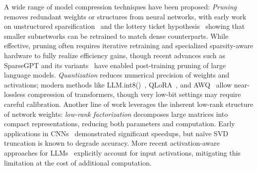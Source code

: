 \documentclass[10pt]{article} %
\theoremstyle{definition}
\theoremstyle{remark}
\begin{document}
A wide range of model compression techniques have been proposed:
\emph{Pruning} removes redundant weights or structures from neural networks, with early work on unstructured sparsification~\citep{han2015learning} and the lottery ticket hypothesis~\citep{frankle2019lottery} showing that smaller subnetworks can be retrained to match dense counterparts.
While effective, pruning often requires iterative retraining and specialized sparsity-aware hardware to fully realize efficiency gains, though recent advances such as SparseGPT and its variants~\citep{frantar2023sparsegpt,ma2023llm, ashkboos2024slicegpt, an2024fluctuation} have enabled post-training pruning of large language models.
\emph{Quantization} reduces numerical precision of weights and activations; modern methods like LLM.int8()~\citep{dettmers2022llmint8}, QLoRA~\citep{dettmers2023qlora}, and AWQ~\citep{lin2024awq} allow near-lossless compression of transformers, though very low-bit settings may require careful calibration.
Another line of work leverages the inherent low-rank structure of network weights: \emph{low-rank factorization} decomposes large matrices into compact representations, reducing both parameters and computation.
Early applications in CNNs~\citep{denton2014exploiting,tai2015convolutional} demonstrated significant speedups, but naïve SVD truncation is known to degrade accuracy.
More recent activation-aware approaches for LLMs~\citep{yuan2023asvd,wang2025svdllm,Li2025AdaSVD,Wang2025DobiSVD} explicitly account for input activations, mitigating this limitation at the cost of additional computation.

\end{document}
